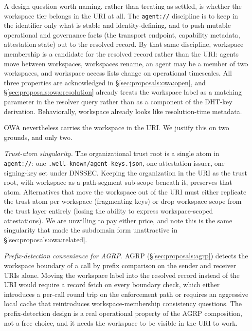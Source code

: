 A design question worth naming, rather than treating as
settled, is whether the workspace tier belongs in the URI
at all. The \texttt{agent://} discipline is to keep in the
identifier only what is stable and identity-defining, and
to push mutable operational and governance facts (the
transport endpoint, capability metadata,
attestation state) out to the resolved record. By that
same discipline, workspace membership is a candidate for
the resolved record rather than the URI: agents move
between workspaces, workspaces rename, an agent may be a
member of two workspaces, and workspace access lists
change on operational timescales. All three properties are
acknowledged in \S\ref{sec:proposals:owa:open}, and
\S\ref{sec:proposals:owa:resolution} already treats the
workspace label as a matching parameter in the resolver
query rather than as a component of the DHT-key
derivation. Behaviorally, workspace already looks like
resolution-time metadata.

OWA nevertheless carries the workspace in the URI. We
justify this on two grounds, and only two.

\emph{Trust-atom singularity.} The organizational trust
root is a single atom in \texttt{agent://}: one
\texttt{.well-known/}\allowbreak\texttt{agent-keys.json}, one attestation
issuer, one signing-key set under DNSSEC. Keeping the
organization in the URI as the trust root, with workspace
as a path-segment sub-scope beneath it, preserves
that atom. Alternatives that move the workspace out of the
URI must either replicate the trust atom per workspace
(fragmenting keys) or drop workspace scope from the trust
layer entirely (losing the ability to express
workspace-scoped attestations). We are unwilling to pay
either price, and note this is the same singularity that
made the subdomain form unattractive in
\S\ref{sec:proposals:owa:related}.

\emph{Prefix-detection convenience for AGRP.} AGRP
(\S\ref{sec:proposals:agrp}) detects the workspace
boundary of a call by prefix comparison on the sender and
receiver URIs alone. Moving the workspace label into the
resolved record instead of the URI would require a record
fetch on every boundary check, which either introduces a
per-call round trip on the enforcement path or requires an
aggressive local cache that reintroduces workspace-membership
consistency questions. The prefix-detection design is a
real operational property of the AGRP composition, not a
free choice, and it needs the workspace to be visible in
the URI to work.

